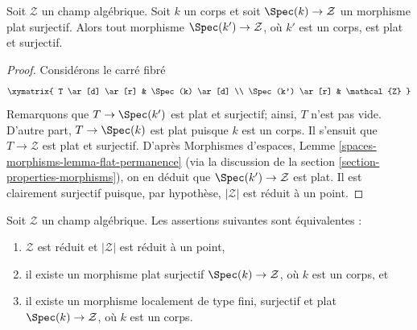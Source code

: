 \begin{lemma}
\label{lemma-flat-cover-by-field}
Soit $\mathcal{Z}$ un champ algébrique. Soit $k$ un corps et soit
$\Spec(k) \to \mathcal{Z}$ un morphisme plat surjectif. Alors tout
morphisme $\Spec(k') \to \mathcal{Z}$, où $k'$ est un corps, est
plat et surjectif.
\end{lemma}

\begin{proof}
Considérons le carré fibré
$$
\xymatrix{
T \ar[d] \ar[r] & \Spec(k) \ar[d] \\
\Spec(k') \ar[r] & \mathcal{Z}
}
$$
Remarquons que $T \to \Spec(k')$ est plat et surjectif; ainsi, $T$
n'est pas vide. D'autre part, $T \to \Spec(k)$ est plat puisque
$k$ est un corps. Il s'ensuit que $T \to \mathcal{Z}$ est plat et surjectif.
D'après
Morphismes d'espaces, Lemme \ref{spaces-morphisms-lemma-flat-permanence}
(via la discussion de la
section \ref{section-properties-morphisms}),
on en déduit que $\Spec(k') \to \mathcal{Z}$ est plat. Il est clairement
surjectif puisque, par hypothèse, $|\mathcal{Z}|$ est réduit à un point.
\end{proof}

\begin{lemma}
\label{lemma-unique-point}
Soit $\mathcal{Z}$ un champ algébrique. Les assertions suivantes sont équivalentes :
\begin{enumerate}
\item $\mathcal{Z}$ est réduit et $|\mathcal{Z}|$ est réduit à un point,
\item il existe un morphisme plat surjectif $\Spec(k) \to \mathcal{Z}$,
où $k$ est un corps, et
\item il existe un morphisme localement de type fini, surjectif et plat
$\Spec(k) \to \mathcal{Z}$, où $k$ est un corps.
\end{enumerate}
\end{lemma}

